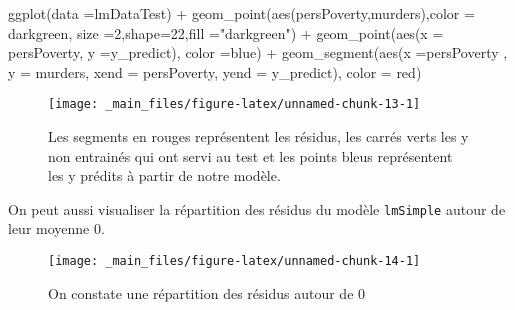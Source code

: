 \documentclass[
]{book}
\newenvironment{Shaded}{\begin{snugshade}}{\end{snugshade}}
\newcommand{\AttributeTok}[1]{\textcolor[rgb]{0.77,0.63,0.00}{#1}}
\newcommand{\DecValTok}[1]{\textcolor[rgb]{0.00,0.00,0.81}{#1}}
\newcommand{\FunctionTok}[1]{\textcolor[rgb]{0.00,0.00,0.00}{#1}}
\newcommand{\NormalTok}[1]{#1}
\newcommand{\SpecialCharTok}[1]{\textcolor[rgb]{0.00,0.00,0.00}{#1}}
\newcommand{\StringTok}[1]{\textcolor[rgb]{0.31,0.60,0.02}{#1}}
\begin{document}
\begin{Shaded}
\begin{Highlighting}[]
\FunctionTok{ggplot}\NormalTok{(}\AttributeTok{data =}\NormalTok{lmDataTest) }\SpecialCharTok{+}
  \FunctionTok{geom\_point}\NormalTok{(}\FunctionTok{aes}\NormalTok{(persPoverty,murders),}\AttributeTok{color =} \StringTok{\textquotesingle{}darkgreen\textquotesingle{}}\NormalTok{,}
             \AttributeTok{size =}\DecValTok{2}\NormalTok{,}\AttributeTok{shape=}\DecValTok{22}\NormalTok{,}\AttributeTok{fill =}\StringTok{"darkgreen"}\NormalTok{) }\SpecialCharTok{+}
  \FunctionTok{geom\_point}\NormalTok{(}\FunctionTok{aes}\NormalTok{(}\AttributeTok{x =}\NormalTok{ persPoverty, }\AttributeTok{y =}\NormalTok{y\_predict), }\AttributeTok{color =}\StringTok{\textquotesingle{}blue\textquotesingle{}}\NormalTok{) }\SpecialCharTok{+}
  \FunctionTok{geom\_segment}\NormalTok{(}\FunctionTok{aes}\NormalTok{(}\AttributeTok{x =}\NormalTok{persPoverty , }
                   \AttributeTok{y =}\NormalTok{ murders, }\AttributeTok{xend =}\NormalTok{ persPoverty, }\AttributeTok{yend =}\NormalTok{ y\_predict),}
               \AttributeTok{color =} \StringTok{\textquotesingle{}red\textquotesingle{}}\NormalTok{)}
\end{Highlighting}
\end{Shaded}

\begin{figure}

{\centering \texttt{[image: \_main\_files/figure-latex/unnamed-chunk-13-1]} 

}

\caption{Les segments en rouges représentent les résidus, les carrés verts les y non entrainés qui ont servi au test et les points bleus représentent les y prédits à partir de notre modèle.}\label{fig:unnamed-chunk-13}
\end{figure}

On peut aussi visualiser la répartition des résidus du modèle \texttt{lmSimple} autour de leur moyenne \(0\).\\

\begin{Shaded}
\end{Shaded}

\begin{figure}

{\centering \texttt{[image: \_main\_files/figure-latex/unnamed-chunk-14-1]} 

}

\caption{On constate une répartition des résidus autour de 0}\label{fig:unnamed-chunk-14}
\end{figure}
\end{document}
